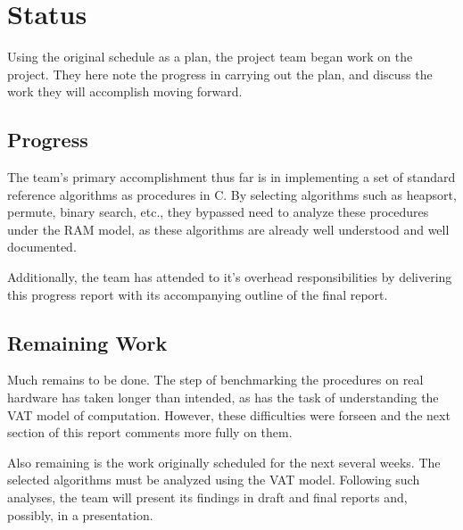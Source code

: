\section{Status}
  
  Using the original schedule as a plan, the project team began work on the
  project. They here note the progress in carrying out the plan, and discuss
  the work they will accomplish moving forward.
  
  \subsection{Progress}
    The team's primary accomplishment thus far is in implementing a set of
    standard reference algorithms as procedures in C. By selecting algorithms
    such as heapsort, permute, binary search, etc., they bypassed need to 
    analyze these procedures under the RAM model, as these algorithms are
    already well understood and well documented.
    
    Additionally, the team has attended to it's overhead responsibilities by
    delivering this progress report with its accompanying outline of the final
    report.
    
  \subsection{Remaining Work}
    
   Much remains to be done. The step of benchmarking the procedures on real
   hardware has taken longer than intended, as has the task of understanding
   the VAT model of computation. However, these difficulties were forseen and
   the next section of this report comments more fully on them.
   
   Also remaining is the work originally scheduled for the next several weeks.
   The selected algorithms must be analyzed using the VAT model. Following such
   analyses, the team will present its findings in draft and final reports and,
   possibly, in a presentation.
